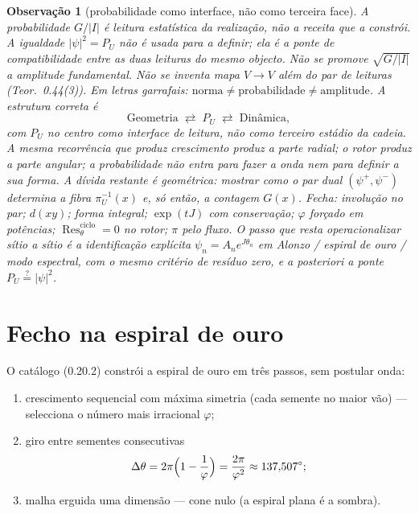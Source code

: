 \documentclass[11pt,a4paper]{article}
\newtheorem{observacao}[teorema]{Observação}
\begin{document}
\begin{observacao}[probabilidade como interface, não como terceira face]
\label{obs:nao-fecha}
A probabilidade $G/|I|$ é leitura estatística da realização, não a receita que a constrói.
A igualdade $|\psi|^2=P_U$ não é usada para a definir; ela é a ponte de compatibilidade entre as duas leituras do mesmo objecto. Não se promove $\sqrt{G/|I|}$ a amplitude fundamental.
Não se inventa mapa $V\to V$ além do par de leituras (Teor.~0.44(3)).
Em letras garrafais: $\text{norma}\neq\text{probabilidade}\neq\text{amplitude}$.
A estrutura correta é
\[
\text{Geometria}
\;\rightleftarrows\;
P_U
\;\rightleftarrows\;
\text{Dinâmica},
\]
com $P_U$ no centro como interface de leitura, não como terceiro estádio da cadeia. A mesma recorrência que produz crescimento produz a parte radial; o rotor produz a parte angular; a probabilidade não entra para fazer a onda nem para definir a sua forma. A dívida restante é geométrica: mostrar como o par dual
$(\psi^+,\psi^-)$ determina a fibra $\pi_U^{-1}(x)$ e, só então, a contagem $G(x)$.
Fecha: involução no par; $d(xy)$; forma integral; $\exp(tJ)$ com conservação;
$\varphi$ forçado em potências; $\operatorname{Res}^{\mathrm{ciclo}}_\theta=0$ no rotor;
$\pi$ pelo fluxo. O passo que resta operacionalizar sítio a sítio é a identificação explícita
$\psi_n=A_n e^{J\theta_n}$ em Alonzo / espiral de ouro / modo espectral, com o mesmo
critério de resíduo zero, e a posteriori a ponte $P_U\stackrel{?}{=}|\psi|^2$.
\end{observacao}


\section{Fecho na espiral de ouro}
\label{sec:espiral}

O catálogo (0.20.2) constrói a espiral de ouro em três passos, sem postular onda:

\begin{enumerate}[leftmargin=1.3em,itemsep=2pt]
  \item crescimento sequencial com máxima simetria (cada semente no maior vão) ---
        selecciona o número mais irracional $\varphi$;
  \item giro entre sementes consecutivas
        \[
        \Delta\theta=2\pi\Bigl(1-\frac1\varphi\Bigr)=\frac{2\pi}{\varphi^2}\approx 137{,}507^\circ;
        \]
  \item malha erguida uma dimensão --- cone nulo (a espiral plana é a sombra).
\end{enumerate}
\end{document}
